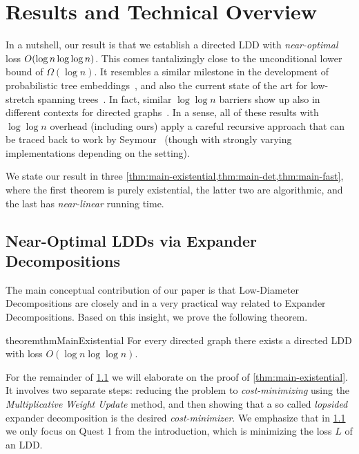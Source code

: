 \section{Results and Technical Overview} \label{sec:overview}
In a nutshell, our result is that we establish a directed LDD with \emph{near-optimal} loss $O(\log n \log\log n)$. This comes tantalizingly close to the unconditional lower bound of $\Omega(\log n)$. It resembles a similar milestone in the development of probabilistic tree embeddings~\cite{Bartal98}, and also the current state of the art for low-stretch spanning trees~\cite{AbrahamN19}. In fact, similar $\log\log n$ barriers show up also in different contexts for directed graphs~\cite{ChechikLRS20}. In a sense, all of these results with $\log\log n$ overhead (including ours) apply a careful recursive approach that can be traced back to work by Seymour~\cite{Seymour95} (though with strongly varying implementations depending on the setting). 

We state our result in three \cref{thm:main-existential,thm:main-det,thm:main-fast}, where the first theorem is purely existential, the latter two are algorithmic, and the last has \emph{near-linear} running time.

\subsection{Near-Optimal LDDs via Expander Decompositions} \label{sec:overview:sec:ldd-exp}
The main conceptual contribution of our paper is that Low-Diameter Decompositions are closely and in a very practical way related to Expander Decompositions. Based on this insight, we prove the following theorem.

\begin{restatable}{theorem}{thmMainExistential} \label{thm:main-existential}
	For every directed graph there exists a directed LDD with loss $O(\log n \log \log n)$.
\end{restatable}

For the remainder of \cref{sec:overview:sec:ldd-exp} we will elaborate on the proof of \cref{thm:main-existential}. It involves two separate steps: reducing the problem to \emph{cost-minimizing} using the \emph{Multiplicative Weight Update} method, and then showing that a so called \emph{lopsided} expander decomposition is the desired \emph{cost-minimizer}. We emphasize that in \cref{sec:overview:sec:ldd-exp} we only focus on Quest 1 from the introduction, which is minimizing the loss $L$ of an LDD.

